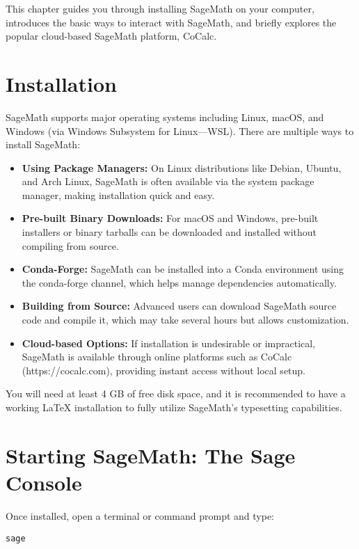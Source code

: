 \documentclass[12pt]{book}
\begin{document}
This chapter guides you through installing SageMath on your computer, introduces the basic ways to interact with SageMath, and briefly explores the popular cloud-based SageMath platform, CoCalc.

\section{Installation}

SageMath supports major operating systems including Linux, macOS, and Windows (via Windows Subsystem for Linux—WSL). There are multiple ways to install SageMath:

\begin{itemize}
  \item \textbf{Using Package Managers:} On Linux distributions like Debian, Ubuntu, and Arch Linux, SageMath is often available via the system package manager, making installation quick and easy.
  \item \textbf{Pre-built Binary Downloads:} For macOS and Windows, pre-built installers or binary tarballs can be downloaded and installed without compiling from source.
  \item \textbf{Conda-Forge:} SageMath can be installed into a Conda environment using the conda-forge channel, which helps manage dependencies automatically.
  \item \textbf{Building from Source:} Advanced users can download SageMath source code and compile it, which may take several hours but allows customization.
  \item \textbf{Cloud-based Options:} If installation is undesirable or impractical, SageMath is available through online platforms such as CoCalc (https://cocalc.com), providing instant access without local setup.
\end{itemize}

You will need at least 4 GB of free disk space, and it is recommended to have a working \LaTeX{} installation to fully utilize SageMath’s typesetting capabilities.

\section{Starting SageMath: The Sage Console}

Once installed, open a terminal or command prompt and type:

\begin{verbatim}
sage
\end{verbatim}
\end{document}
